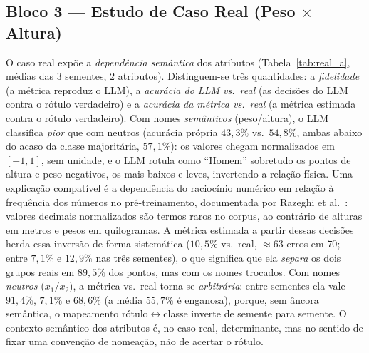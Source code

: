 \documentclass[12pt,a4paper]{article}
\begin{document}
\subsection{Bloco 3 — Estudo de Caso Real (Peso $\times$ Altura)}
\label{sec:res_bloco3}

O caso real expõe a \emph{dependência semântica} dos atributos
(Tabela~\ref{tab:real_a}, médias das $3$ sementes, $2$ atributos). Distinguem-se três
quantidades: a \emph{fidelidade} (a métrica reproduz o LLM), a \emph{acurácia do LLM vs.\
real} (as decisões do LLM contra o rótulo verdadeiro) e a \emph{acurácia da métrica vs.\
real} (a métrica estimada contra o rótulo verdadeiro). Com nomes \emph{semânticos}
(peso/altura), o LLM classifica \emph{pior} que com neutros (acurácia própria $43{,}3\%$ vs.\
$54{,}8\%$, ambas abaixo do acaso da classe majoritária, $57{,}1\%$): os valores chegam
normalizados em $[-1, 1]$, sem unidade, e o LLM rotula como ``Homem'' sobretudo os pontos
de altura e peso negativos, os mais baixos e leves, invertendo a relação física. Uma
explicação compatível é a dependência do raciocínio numérico em relação à frequência dos
números no pré-treinamento, documentada por Razeghi et
al.~\cite{razeghiImpactPretraining2022}: valores decimais normalizados são termos raros no
corpus, ao contrário de alturas em metros e pesos em quilogramas. A métrica
estimada a partir dessas decisões herda essa inversão de forma sistemática ($10{,}5\%$ vs.\
real, $\approx 63$ erros em $70$; entre $7{,}1\%$ e $12{,}9\%$ nas três sementes), o que
significa que ela \emph{separa} os dois grupos reais em $89{,}5\%$ dos pontos, mas com os
nomes trocados. Com nomes \emph{neutros} ($x_1/x_2$), a métrica vs.\ real torna-se
\emph{arbitrária}: entre sementes ela vale $91{,}4\%$, $7{,}1\%$ e $68{,}6\%$ (a média
$55{,}7\%$ é enganosa), porque, sem âncora semântica, o mapeamento
rótulo$\leftrightarrow$classe inverte de semente para semente. O contexto semântico dos
atributos é, no caso real, determinante, mas no sentido de fixar uma convenção de
nomeação, não de acertar o rótulo.
\end{document}

